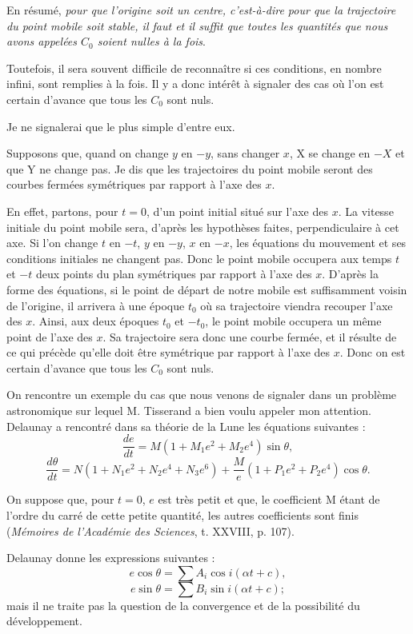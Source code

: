 \documentclass[11pt]{article}
\begin{document}
En résumé, \emph{pour que l’origine soit un centre, c’est-à-dire pour que la trajectoire du point mobile soit stable, il faut et il suffit que toutes les quantités que nous avons appelées $C_0$ soient nulles à la fois}.

Toutefois, il sera souvent difficile de reconnaître si ces conditions, en nombre infini, sont remplies à la fois. Il y a donc intérêt à signaler des cas où l’on est certain d’avance que tous les $C_0$ sont nuls.

Je ne signalerai que le plus simple d’entre eux.

Supposons que, quand on change $y$ en $-y$, sans changer $x$, X se change en $-X$ et que Y ne change pas. Je dis que les trajectoires du point mobile seront des courbes fermées symétriques par rapport à l’axe des $x$.

En effet, partons, pour $t=0$, d’un point initial situé sur l’axe des $x$. La vitesse initiale du point mobile sera, d’après les hypothèses faites, perpendiculaire à cet axe. Si l’on change $t$ en $-t$, $y$ en $-y$, $x$ en $-x$, les équations du mouvement et ses conditions initiales ne changent pas. Donc le point mobile occupera aux temps $t$ et $-t$ deux points du plan symétriques par rapport à l’axe des $x$. D’après la forme des équations, si le point de départ de notre mobile est suffisamment voisin de l’origine, il arrivera à une époque $t_0$ où sa trajectoire viendra recouper l’axe des $x$. Ainsi, aux deux époques $t_0$ et $-t_0$, le point mobile occupera un même point de l’axe des $x$. Sa trajectoire sera donc une courbe fermée, et il résulte de ce qui précède qu’elle doit être symétrique par rapport à l’axe des $x$. Donc on est certain d’avance que tous les $C_0$ sont nuls.

On rencontre un exemple du cas que nous venons de signaler dans un problème astronomique sur lequel M. Tisserand a bien voulu appeler mon attention. Delaunay a rencontré dans sa théorie de la Lune les équations suivantes :
\[
\frac{de}{dt}=M(1+M_1e^2+M_2e^4)\sin\theta,
\]
\[
\frac{d\theta}{dt}=N(1+N_1e^2+N_2e^4+N_3e^6)+\frac{M}{e}(1+P_1e^2+P_2e^4)\cos\theta.
\]

On suppose que, pour $t=0$, $e$ est très petit et que, le coefficient M étant de l’ordre du carré de cette petite quantité, les autres coefficients sont finis (\emph{Mémoires de l’Académie des Sciences}, t. XXVIII, p. 107).

Delaunay donne les expressions suivantes :
\[
e\cos\theta=\sum A_i\cos i(\alpha t+c),
\]
\[
e\sin\theta=\sum B_i\sin i(\alpha t+c);
\]
mais il ne traite pas la question de la convergence et de la possibilité du développement.
\end{document}
